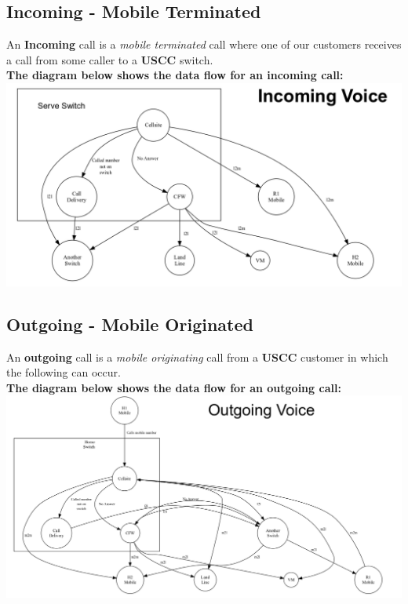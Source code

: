 \documentclass[12pt,twoside]{article}
\begin{document}
\begin{landscape}  
\subsection{Incoming - Mobile Terminated}
\label{sec:orgheadline10}
An \textbf{Incoming} call is a \emph{mobile terminated} call where one of
our customers receives a call from some caller to a \textbf{USCC}
switch.\\
\textbf{The diagram below shows the data flow for an incoming
call:} \\
\includegraphics[width=.9\linewidth]{Pictures/incoming.png}

\newpage 
\subsection{Outgoing - Mobile Originated}
\label{sec:orgheadline11}
An \textbf{outgoing} call is a \emph{mobile originating} call from a \textbf{USCC} customer in which the following can occur.\\
\textbf{The diagram below shows the data flow for an outgoing call:}
\\
\includegraphics[width=.9\linewidth]{Pictures/outgoing.png}

\end{landscape} 
\newpage
\end{document}
